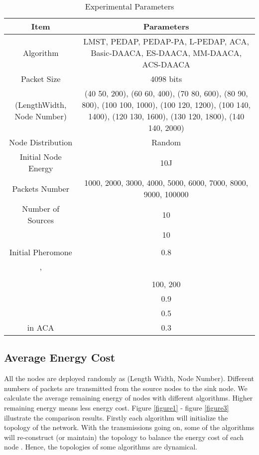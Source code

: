 \documentclass{elsarticle}
\begin{document}
\begin{table}
\centering
\caption{Experimental Parameters} \label{table3}
\begin{tabular}{c|c}
\hline
\textbf{Item} & \textbf{Parameters} \\
\hline
Algorithm & \multicolumn{1}{p{6cm}}{LMST, PEDAP, PEDAP-PA, L-PEDAP, ACA, Basic-DAACA, ES-DAACA, MM-DAACA, ACS-DAACA} \\
Packet Size & 4098 bits \\
(LengthWidth, Node Number) & \multicolumn{1}{p{6cm}}{(40  50, 200), (60  60, 400), (70  80, 600), (80  90, 800), (100  100, 1000), (100  120, 1200), (100  140, 1400), (120  130, 1600), (130  120, 1800), (140  140, 2000)} \\
Node Distribution & Random \\
Initial Node Energy & 10J \\
Packets Number & \multicolumn{1}{p{6cm}}{1000, 2000, 3000, 4000, 5000, 6000, 7000, 8000, 9000, 100000} \\
Number of Sources & 10 \\
 & 10 \\
 &  \\
Initial Pheromone & 0.8 \\
,  &  \\
 &  \\
 & 100, 200 \\
 & 0.9 \\
 & 0.5 \\
 in ACA & 0.3\\
\hline
\end{tabular}

\end{table}

\subsection{Average Energy Cost} \label{averageEnergyCost}
All the nodes are deployed randomly as (Length  Width, Node Number). Different numbers of packets are transmitted from the source nodes to the sink node. We calculate the average remaining energy of nodes with different algorithms. Higher remaining energy means less energy cost. Figure \ref{figure1} - figure \ref{figure3} illustrate the comparison results. Firstly each algorithm will initialize the topology of the network. With the transmissions going on, some of the algorithms will re-construct (or maintain) the topology to balance the energy cost of each node \cite{label-32}. Hence, the topologies of some algorithms are dynamical.
\end{document}
